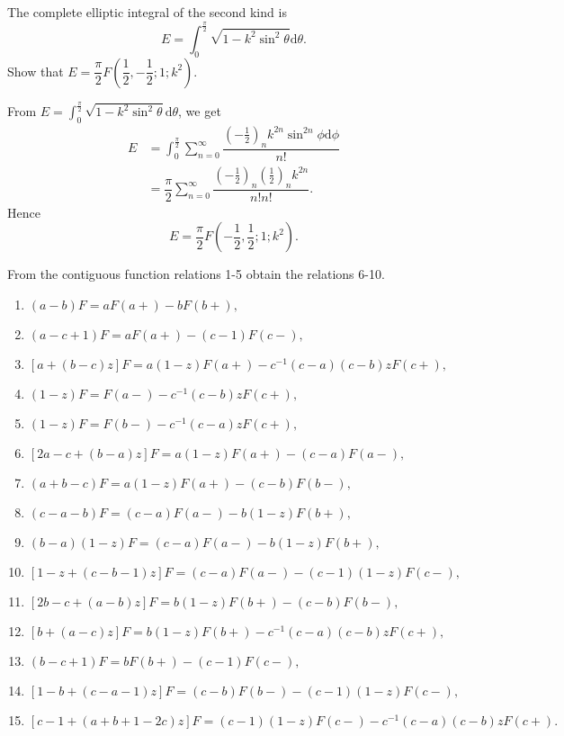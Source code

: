 \begin{problem} \label{problem20chapter4}
The complete elliptic integral of the second kind is 
$$E = \displaystyle\int_0^{\frac{\pi}{2}} \sqrt{1 - k^2 \sin^2 \theta} \mathrm{d} \theta.$$
Show that $E = \dfrac{\pi}{2} F \left(\dfrac{1}{2}, -\dfrac{1}{2};1;k^2 \right).$
\end{problem}
\begin{solution}
From $E = \displaystyle\int_0^{\frac{\pi}{2}} \sqrt{1 - k^2 \sin^2 \theta} \mathrm{d} \theta$,
we get
$$\begin{array}{ll}
E &= \displaystyle\int_0^{\frac{\pi}{2}} \displaystyle\sum_{n=0}^{\infty} \dfrac{ \left( -\frac{1}{2} \right)_n k^{2n} \sin^{2n} \phi \mathrm{d} \phi}{n!} \\
&= \dfrac{\pi}{2} \displaystyle\sum_{n=0}^{\infty} \dfrac{ \left( -\frac{1}{2} \right)_n \left( \frac{1}{2} \right)_n k^{2n}}{n! n!}.
\end{array}$$
Hence
$$E = \dfrac{\pi}{2} F \left( - \dfrac{1}{2}, \dfrac{1}{2}; 1 ; k^2 \right).$$
\end{solution}
\begin{problem} \label{problem21chapter4}
From the contiguous function relations 1-5 obtain the relations 6-10.
\begin{enumerate}
\item $(a-b)F = aF(a+) - bF(b+),$
\item $(a-c+1)F = aF(a+) - (c-1)F(c-),$
\item $[a+(b-c)z]F = a(1-z)F(a+) - c^{-1}(c-a)(c-b)zF(c+),$
\item $(1-z)F = F(a-) - c^{-1}(c-b)zF(c+),$
\item $(1-z)F = F(b-) - c^{-1}(c-a)zF(c+),$
\item $[2a-c+(b-a)z]F = a(1-z)F(a+) - (c-a)F(a-),$
\item $(a+b-c)F = a(1-z)F(a+) - (c-b)F(b-),$
\item $(c-a-b)F = (c-a)F(a-) - b(1-z)F(b+),$
\item $(b-a)(1-z)F = (c-a)F(a-)-b(1-z)F(b+),$
\item $[1-z+(c-b-1)z]F = (c-a)F(a-) - (c-1)(1-z)F(c-),$
\item $[2b-c+(a-b)z]F = b(1-z)F(b+) - (c-b)F(b-),$
\item $[b+(a-c)z]F = b(1-z)F(b+) - c^{-1}(c-a)(c-b)zF(c+),$
\item $(b-c+1)F = bF(b+) - (c-1)F(c-),$
\item $[1-b+(c-a-1)z]F = (c-b)F(b-) - (c-1)(1-z)F(c-),$
\item $[c-1+(a+b+1-2c)z]F = (c-1)(1-z)F(c-) - c^{-1}(c-a)(c-b)zF(c+).$
\end{enumerate}
\end{problem}
